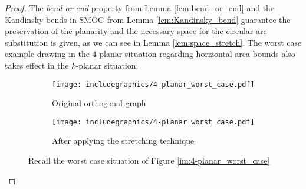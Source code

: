 \begin{proof}
	The \textit{bend or end} property from Lemma \ref{lem:bend_or_end} and the Kandinsky bends in SMOG from Lemma \ref{lem:Kandinsky_bend} guarantee the preservation of the planarity and the necessary space for the circular arc substitution is given, as we can see in Lemma \ref{lem:space_stretch}. The worst case example drawing in the 4-planar situation regarding horizontal area bounds also takes effect in the $k$-planar situation.
	\begin{figure}[H]
		\centering
		\begin{subfigure}{0.4\textwidth}
			\centering
			\texttt{[image: includegraphics/4-planar\_worst\_case.pdf]}
			\caption{Original orthogonal graph}	
		\end{subfigure}
		\begin{subfigure}{0.6\textwidth}
			\centering
			\texttt{[image: includegraphics/4-planar\_worst\_case.pdf]}
			\caption{After applying the stretching technique}
		\end{subfigure}
		\caption*{Recall the worst case situation of Figure \ref{im:4-planar_worst_case}}
	\end{figure}
\end{proof}
\newpage
